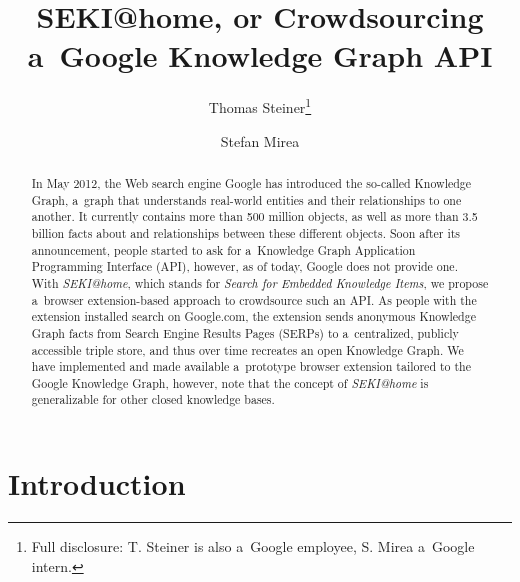 \documentclass[runningheads,a4paper]{llncs}
\begin{document}
\title{SEKI@home, or Crowdsourcing\\ a~Google Knowledge Graph API}

\author{
  Thomas Steiner\thanks{Full disclosure: T. Steiner is also a~Google employee, S. Mirea a~Google intern.} \and
  Stefan Mirea
}


\maketitle
\setcounter{footnote}{0}

\begin{abstract}
In May 2012, the Web search engine Google has introduced the so-called Knowledge Graph,
a~graph that understands real-world entities and their relationships to one another.
It currently contains more than 500 million objects,
as well as more than 3.5 billion facts about
and relationships between these different objects.
Soon after its announcement, people started to ask
for a~Knowledge Graph Application Programming Interface (API),
however, as of today, Google does not provide one.
With \emph{SEKI@home}, which stands for \emph{Search for Embedded Knowledge Items},
we propose a~browser extension-based approach to crowdsource such an API.
As people with the extension installed search on Google.com,
the extension sends anonymous Knowledge Graph facts from Search Engine Results Pages (SERPs)
to a~centralized, publicly accessible triple store,
and thus over time recreates an open Knowledge Graph.
We have implemented and made available a~prototype browser extension
tailored to the Google Knowledge Graph, however,
note that the concept of \emph{SEKI@home} is generalizable for other closed knowledge bases.
\end{abstract}

\section{Introduction}
\end{document}
